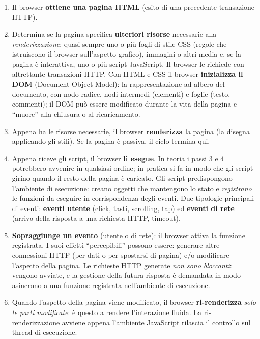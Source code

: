 \begin{enumerate}
  \item Il browser \textbf{ottiene una pagina HTML} (esito di una precedente transazione HTTP).
  \item Determina se la pagina specifica \textbf{ulteriori risorse} necessarie alla
        \emph{renderizzazione}: quasi sempre uno o pi\`u fogli di stile CSS (regole che
        istruiscono il browser sull'aspetto grafico), immagini o altri media e, se la pagina
        \`e interattiva, uno o pi\`u script JavaScript. Il browser le richiede con altrettante
        transazioni HTTP. Con HTML e CSS il browser \textbf{inizializza il DOM}
        (Document Object Model): la rappresentazione ad albero del documento, con nodo radice,
        nodi intermedi (elementi) e foglie (testo, commenti); il DOM pu\`o essere modificato
        durante la vita della pagina e ``muore'' alla chiusura o al ricaricamento.
  \item Appena ha le risorse necessarie, il browser \textbf{renderizza} la pagina
        (la disegna applicando gli stili). Se la pagina \`e passiva, il ciclo termina qui.
  \item Appena riceve gli script, il browser \textbf{li esegue}. In teoria i passi 3 e 4
        potrebbero avvenire in qualsiasi ordine; in pratica si fa in modo che gli script
        girino quando il resto della pagina \`e caricato. Gli script predispongono l'ambiente
        di esecuzione: creano oggetti che mantengono lo stato e \emph{registrano} le funzioni
        da eseguire in corrispondenza degli eventi. Due tipologie principali di eventi:
        \textbf{eventi utente} (click, tasti, scrolling, tap) ed \textbf{eventi di rete}
        (arrivo della risposta a una richiesta HTTP, timeout).
  \item \textbf{Sopraggiunge un evento} (utente o di rete): il browser attiva la funzione
        registrata. I suoi effetti ``percepibili'' possono essere: generare altre connessioni
        HTTP (per dati o per spostarsi di pagina) e/o modificare l'aspetto della pagina.
        Le richieste HTTP generate \emph{non sono bloccanti}: vengono avviate, e la gestione
        della futura risposta \`e demandata in modo asincrono a una funzione registrata
        nell'ambiente di esecuzione.
  \item Quando l'aspetto della pagina viene modificato, il browser \textbf{ri-renderizza}
        \emph{solo le parti modificate}: \`e questo a rendere l'interazione fluida.
        La ri-renderizzazione avviene appena l'ambiente JavaScript rilascia il controllo sul
        thread di esecuzione.
\end{enumerate}

